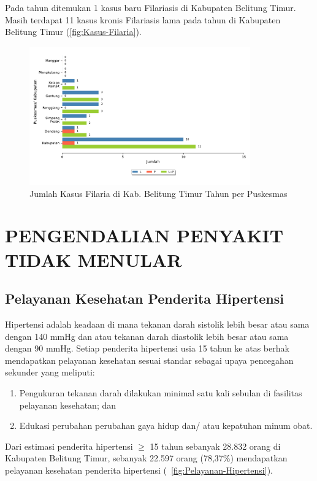 Pada tahun \tP ditemukan 1 kasus baru Filariasis di Kabupaten Belitung Timur.
Masih terdapat 11 kasus kronis Filariasis lama pada tahun \tP di Kabupaten Belitung Timur (\autoref{fig:Kasus-Filaria}).

\begin{figure}[H]
  \centering
  \includegraphics[width=0.85\textwidth]{bab_06/bab_06_12_kasusFilaria}
  \caption{Jumlah Kasus Filaria di Kab. Belitung Timur Tahun \tP per Puskesmas}
  \label{fig:Kasus-Filaria}
\end{figure}

\section[PENGENDALIAN PTM]{PENGENDALIAN PENYAKIT TIDAK MENULAR}
\subsection{Pelayanan Kesehatan Penderita Hipertensi}
Hipertensi adalah keadaan di mana tekanan darah sistolik lebih besar atau sama dengan 140 mmHg dan atau tekanan darah diastolik lebih besar atau sama dengan 90 mmHg.
Setiap penderita hipertensi usia 15 tahun ke atas berhak mendapatkan pelayanan kesehatan sesuai standar sebagai upaya pencegahan sekunder yang meliputi:
\begin{enumerate}
  \item Pengukuran tekanan darah dilakukan minimal satu kali sebulan di fasilitas pelayanan kesehatan; dan
  \item Edukasi perubahan perubahan gaya hidup dan/ atau kepatuhan minum obat.
\end{enumerate}

Dari estimasi penderita hipertensi $\geq$ 15 tahun sebanyak 28.832 orang di Kabupaten Belitung Timur, sebanyak 22.597 orang (78,37\%) mendapatkan pelayanan kesehatan penderita hipertensi (~\autoref{fig:Pelayanan-Hipertensi}).

